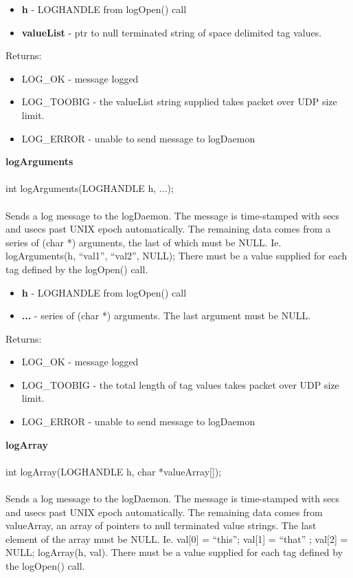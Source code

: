 \documentclass[11pt]{article}
\begin{document}
\begin{itemize}
  \item {\bf h} - LOGHANDLE from logOpen() call
  \item {\bf valueList} - ptr to null terminated string of space delimited tag values.
\end{itemize}
Returns:

\begin{itemize}
  \item LOG\_OK - message logged
  \item LOG\_TOOBIG - the valueList string supplied takes packet over UDP size limit.
  \item LOG\_ERROR - unable to send message to logDaemon
\end{itemize}
{\bf logArguments}\\
\\
int logArguments(LOGHANDLE h, ...);\\
\\
Sends a log message to the logDaemon. The message is time-stamped with secs and usecs past UNIX epoch automatically. The remaining data comes from a series of (char *) arguments, the last of which must be NULL. Ie. logArguments(h, ``val1'', ``val2'', NULL); There must be a value supplied for each tag defined by the logOpen() call.

\begin{itemize}
  \item {\bf h} - LOGHANDLE from logOpen() call
  \item {\bf ...} - series of (char *) arguments. The last argument must be NULL.
\end{itemize}
Returns:

\begin{itemize}
  \item LOG\_OK - message logged
  \item LOG\_TOOBIG - the total length of tag values takes packet over UDP size limit.
  \item LOG\_ERROR - unable to send message to logDaemon
\end{itemize}
{\bf logArray}\\
\\
int logArray(LOGHANDLE h, char *valueArray[]);\\
\\
Sends a log message to the logDaemon. The message is time-stamped with secs and usecs past UNIX epoch automatically. The remaining data comes from valueArray, an array of pointers to null terminated value strings. The last element of the array must be NULL. Ie. val[0] = ``this''; val[1] = ``that'' ; val[2] = NULL; logArray(h, val). There must be a value supplied for each tag defined by the logOpen() call.
\end{document}
